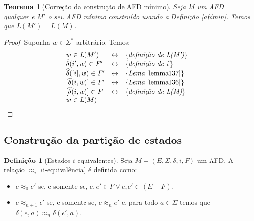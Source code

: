 \documentclass[a4paper]{article}
\newtheorem{Theorem}{Teorema}
\theoremstyle{definition}
\newtheorem{Definition}{Definição}
\begin{document}
  \begin{Theorem}[Correção da construção de AFD mínimo]
    Seja $M$ um AFD qualquer e $M'$ o seu AFD mínimo construído usando a
    Definição \ref{afdmin}. Temos que $L(M') = L(M)$.
  \end{Theorem}
  \begin{proof}
    Suponha $w\in \Sigma^*$ arbitrário. Temos:
    \[
      \begin{array}{lcl}
        w \in L(M')                   & \leftrightarrow & \{\textit{definição de L(M')}\}\\
        \widehat{\delta}(i',w) \in F' & \leftrightarrow & \{\textit{definição de i'}\} \\
        \widehat{\delta}([i],w)\in F'  & \leftrightarrow & \{\textit{Lema }\ref{lemma137}\}\\
        \lbrack\widehat{\delta}(i,w)\rbrack \in F' & \leftrightarrow & \{\textit{Lema }\ref{lemma136}\}\\
        \lbrack\widehat{\delta}(i,w)\rbrack \in F  & \leftrightarrow &
                                                                       \{\textit{definição
                                                                       de L(M)}\}\\
        w \in L(M)  
      \end{array}
    \]
  \end{proof}

  \subsection{Construção da partição de estados}

  \begin{Definition}[Estados $i$-equivalentes]\label{iequiv}
    Seja $M = (E,\Sigma,\delta, i, F)$ um  AFD. A relação $\approx_i$
    (i-equivalência) é definida como:
    \begin{itemize}
      \item $e \approx_0 e'$ se, e somente se, $e,e' \in F \lor e,e' \in (E - F)$.
      \item $e \approx_{n + 1} e'$ se, e somente se, $e \approx_n e'$ e, para
        todo $a\in \Sigma$ temos que $\delta(e,a)\approx_n\delta(e',a)$.
      \end{itemize}
  \end{Definition}
\end{document}
